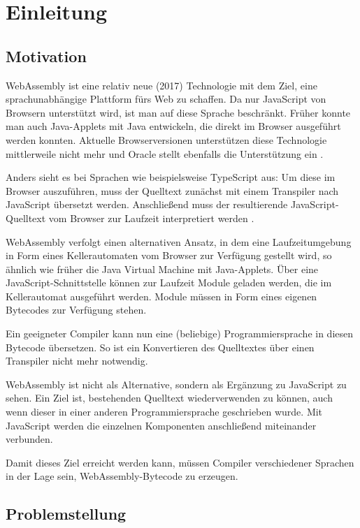 \chapter{Einleitung}

\section{Motivation}

WebAssembly \cite{WebAssemblyWebsite} ist eine relativ neue (2017) Technologie mit dem Ziel, eine sprachunabhängige Plattform fürs Web zu schaffen. Da nur JavaScript von Browsern unterstützt wird, ist man auf diese Sprache beschränkt. Früher konnte man auch Java-Applets mit Java entwickeln, die direkt im Browser ausgeführt werden konnten. Aktuelle Browserversionen unterstützen diese Technologie mittlerweile nicht mehr und Oracle stellt ebenfalls die Unterstützung ein \cite{OracleJavaSESupportRoadmap}.

Anders sieht es bei Sprachen wie beispielsweise TypeScript aus: Um diese im Browser auszuführen, muss der Quelltext zunächst mit einem Transpiler nach JavaScript übersetzt werden. Anschließend muss der resultierende JavaScript-Quelltext vom Browser zur Laufzeit interpretiert werden \cite{TypeScript}.

WebAssembly verfolgt einen alternativen Ansatz, in dem eine Laufzeitumgebung in Form eines Kellerautomaten vom Browser zur Verfügung gestellt wird, so ähnlich wie früher die Java Virtual Machine mit Java-Applets. Über eine JavaScript-Schnittstelle können zur Laufzeit Module geladen werden, die im Kellerautomat ausgeführt werden. Module müssen in Form eines eigenen Bytecodes zur Verfügung stehen.

Ein geeigneter Compiler kann nun eine (beliebige) Programmiersprache in diesen Bytecode übersetzen. So ist ein Konvertieren des Quelltextes über einen Transpiler nicht mehr notwendig.

WebAssembly ist nicht als Alternative, sondern als Ergänzung zu JavaScript zu sehen. Ein Ziel ist, bestehenden Quelltext wiederverwenden zu können, auch wenn dieser in einer anderen Programmiersprache geschrieben wurde. Mit JavaScript werden die einzelnen Komponenten anschließend miteinander verbunden.

Damit dieses Ziel erreicht werden kann, müssen Compiler verschiedener Sprachen in der Lage sein, WebAssembly-Bytecode zu erzeugen.

\section{Problemstellung}

